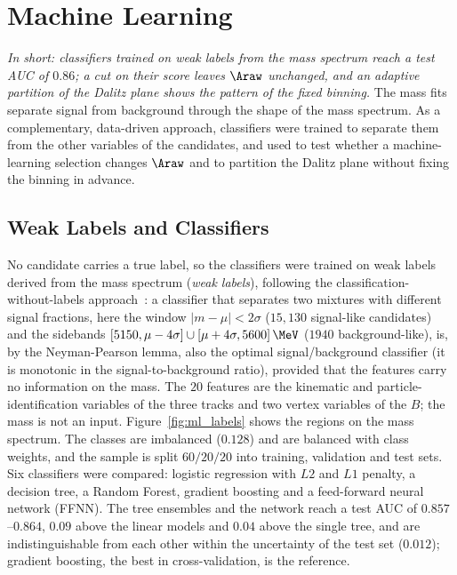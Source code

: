 \section{Machine Learning}
\label{sec:ml_body}
\emph{In short: classifiers trained on weak labels from the mass spectrum reach a test AUC of $0.86$; a cut on their score leaves $\Araw$ unchanged, and an adaptive partition of the Dalitz plane shows the pattern of the fixed binning.}
The mass fits separate signal from background through the shape of the mass spectrum. As a complementary, data-driven approach, classifiers were trained to separate them from the other variables of the candidates, and used to test whether a machine-learning selection changes $\Araw$ and to partition the Dalitz plane without fixing the binning in advance.
\subsection{Weak Labels and Classifiers}
\label{sec:ml_labels_body}
\label{sec:ml_models_body}
No candidate carries a true label, so the classifiers were trained on weak labels derived from the mass spectrum (\emph{weak labels}), following the classification-without-labels approach~\cite{cwola}: a classifier that separates two mixtures with different signal fractions, here the window $|m-\mu|<2\sigma$ ($15{,}130$ signal-like candidates) and the sidebands $[5150,\mu-4\sigma]\cup[\mu+4\sigma,5600]\,\MeV$ ($1940$ background-like), is, by the Neyman-Pearson lemma, also the optimal signal/background classifier (it is monotonic in the signal-to-background ratio), provided that the features carry no information on the mass. The $20$ features are the kinematic and particle-identification variables of the three tracks and two vertex variables of the $B$; the mass is not an input. Figure~\ref{fig:ml_labels} shows the regions on the mass spectrum. The classes are imbalanced ($0.128$) and are balanced with class weights, and the sample is split $60/20/20$ into training, validation and test sets. Six classifiers were compared: logistic regression with $L2$ and $L1$ penalty, a decision tree, a Random Forest, gradient boosting and a feed-forward neural network (FFNN). The tree ensembles and the network reach a test AUC of $0.857$--$0.864$, $0.09$ above the linear models and $0.04$ above the single tree, and are indistinguishable from each other within the uncertainty of the test set ($0.012$); gradient boosting, the best in cross-validation, is the reference.

